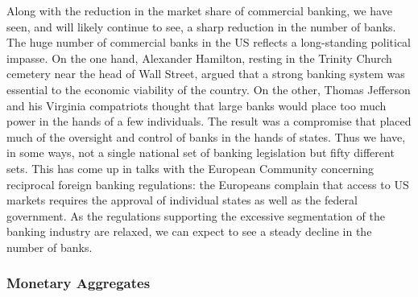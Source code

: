 \documentclass[letterpaper,12pt]{article}
\begin{document}
     Along with the reduction in the market share of commercial banking, we
have seen, and will likely continue to see, a sharp reduction in the number of banks.  The huge
number of commercial banks in the US reflects a long-standing political impasse.  On the one hand,
Alexander Hamilton, resting in the Trinity Church cemetery near the head of Wall Street, argued
that a strong banking system was essential to the economic viability of the country.  On the
other, Thomas Jefferson and his Virginia compatriots thought that large banks would place too much
power in the hands of a few individuals.  The result was a compromise that placed much of the
oversight and control of banks in the hands of states.  Thus we have, in some ways, not a single
national set of banking legislation but fifty different sets.  This has come up in talks with the
European Community concerning reciprocal foreign banking regulations:  the Europeans complain that
access to US markets requires the approval of individual states as well as the federal government.
As the regulations supporting the excessive segmentation of the banking industry are relaxed, we
can expect to see a steady decline in the number of banks.


\subsubsection*{Monetary Aggregates}
\end{document}
